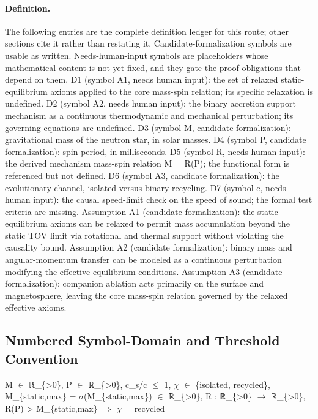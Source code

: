 \documentclass[conference]{IEEEtran}
\begin{document}
\paragraph{Definition.} The following entries are the complete definition ledger for this route; other sections cite it rather than restating it. Candidate-formalization symbols are usable as written. Needs-human-input symbols are placeholders whose mathematical content is not yet fixed, and they gate the proof obligations that depend on them. D1 (symbol A1, needs human input): the set of relaxed static-equilibrium axioms applied to the core mass-spin relation; its specific relaxation is undefined. D2 (symbol A2, needs human input): the binary accretion support mechanism as a continuous thermodynamic and mechanical perturbation; its governing equations are undefined. D3 (symbol M, candidate formalization): gravitational mass of the neutron star, in solar masses. D4 (symbol P, candidate formalization): spin period, in milliseconds. D5 (symbol R, needs human input): the derived mechanism mass-spin relation M = R(P); the functional form is referenced but not defined. D6 (symbol A3, candidate formalization): the evolutionary channel, isolated versus binary recycling. D7 (symbol c, needs human input): the causal speed-limit check on the speed of sound; the formal test criteria are missing. Assumption A1 (candidate formalization): the static-equilibrium axioms can be relaxed to permit mass accumulation beyond the static TOV limit via rotational and thermal support without violating the causality bound. Assumption A2 (candidate formalization): binary mass and angular-momentum transfer can be modeled as a continuous perturbation modifying the effective equilibrium conditions. Assumption A3 (candidate formalization): companion ablation acts primarily on the surface and magnetosphere, leaving the core mass-spin relation governed by the relaxed effective axioms.~\cite{cite_55957f4ce67bd972,cite_c369df652181e8f7,cite_f16cd637681fe829}

\subsection{Numbered Symbol-Domain and Threshold Convention}
M $\in$ ℝ\_\{>0\}, P $\in$ ℝ\_\{>0\}, c\_s/c $\leq$ 1, $\chi$ $\in$ \{isolated, recycled\}, M\_\{static,max\} = $\sigma$(M\_\{static,max\}) $\in$ ℝ\_\{>0\}, R : ℝ\_\{>0\} $\rightarrow$ ℝ\_\{>0\}, R(P) > M\_\{static,max\} $\Rightarrow$ $\chi$ = recycled
\end{document}
